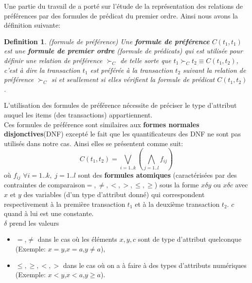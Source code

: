 \documentclass[a4paper,12pt,openany,oneside]{article}
\newtheorem{defn}{Definition} %
\begin{document}
 	Une partie du travail de \cite{CHO} a porté sur l'étude de la représentation des relations de préférences par des formules de prédicat du premier ordre. Ainsi nous avons la définition suivante:

\begin{defn}(formule de préférence)
	Une  \textbf{formule de préférence} $C(t_{1},t_{1})$ est une \textbf{formule de premier ordre} (formule de prédicats) qui est utilisée pour définir une relation de préférence $\succ_{C}$ de telle sorte que $t_{1}\succ_{C} t_{2}\equiv C(t_{1},t_{2})$, c'est à dire la transaction $t_1$ est préférée à la transaction $t_2$ suivant la relation de préférence $\succ_C$ si et seullement si elles vérifient la formule de prédicat $C(t_1,t_2)$.\\
\end{defn}
L'utilisation des formules de préférence nécessite de préciser le type d'attribut auquel les items (des transactions) appartiennent.\\
Ces formules de préférence sont similaires aux \textbf{formes normales disjonctives}(DNF) excepté le fait que les quantificateurs des DNF ne sont pas utilisés dans notre cas. Ainsi elles se présentent comme suit:
 	 \[  
 	 	C(t_{1},t_{2})=\underset{i=1..k}{\bigvee}(\underset{j=1..l}{\bigwedge} f_{ij})
 	 \]
 	  où $f_{ij}$  $\forall i =1..k,\; j=1..l$ sont des \textbf{formules atomiques} (caractérisées par des contraintes de comparaison$= ,\neq,<,>,\leq,\geq$) sous la forme $x\delta y$ ou $x\delta c$ avec $x$ et $y$ des variables (d'un type d'attribut donné) qui correspondent respectivement à la première transaction $t_{1}$ et à la deuxième transaction $t_{2}$. $c$ quand à lui est une constante.\\
 	  $\delta$ prend les valeurs
\begin{itemize}
\item  $=$,$\neq$ dans le cas où les éléments $x,y,c$ sont de type d'attribut quelconque (Exemple: $x=y$,$x=a$,$y\neq a$),  
\item $\leqslant,\geqslant,<,>$ dans le cas où on a à faire à des types d'attributs numériques (Exemple: $x<y$,$x<a$,$y\geqslant a$).
\end{itemize}
\end{document}
